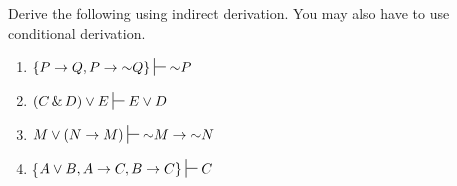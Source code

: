 \noindent\problempart Derive the following using indirect derivation. You may also have to use conditional derivation.
\label{derivation_set_with_const_d}
\begin{enumerate}[label=(\arabic*)]

\item $\{P \eif Q, P \eif \enot Q\} \sststile{}{} \enot P$


\item $(C\eand D)\eor E \sststile{}{} E\eor D$


\item $M\eor(N\eif M) \sststile{}{} \enot M \eif \enot N$ \label{DeM4}




\item \label{itm:const_d} \{$A \eor B, A \eif C, B \eif C\} \sststile{}{} C$



\end{enumerate}
